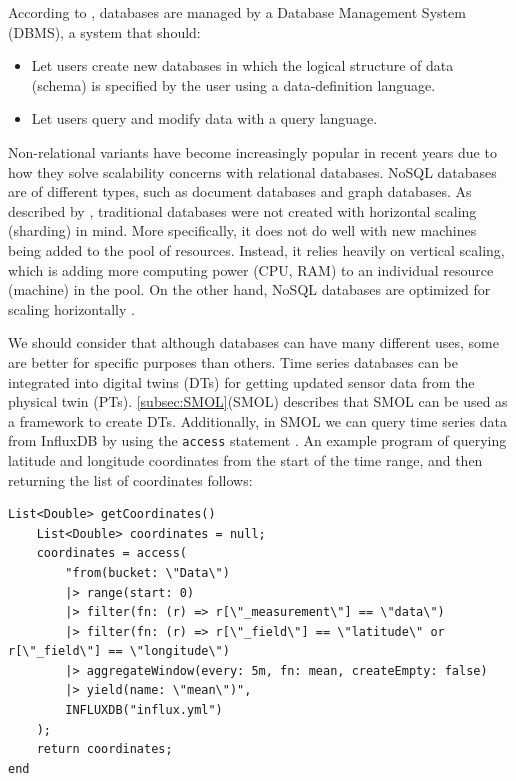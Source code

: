 \documentclass{article}
\begin{document}
According to \citeauthor{garcia-molina_database_2002}, databases are managed by a Database Management System (DBMS), a system that should:
\begin{itemize}
    \item Let users create new databases in which the logical structure of data (schema) is specified by the user using a data-definition language.
    \item Let users query and modify data with a query language.
\end{itemize}

Non-relational variants have become increasingly popular in recent years due to how they solve scalability concerns with relational databases. NoSQL databases are of different types, such as document databases and graph databases. As described by \citeauthor{mohamed_relational_2014}, traditional databases were not created with horizontal scaling (sharding) in mind. More specifically, it does not do well with new machines being added to the pool of resources. Instead, it relies heavily on vertical scaling, which is adding more computing power (CPU, RAM) to an individual resource (machine) in the pool. On the other hand, NoSQL databases are optimized for scaling horizontally \cite{mohamed_relational_2014, kim_geoycsb_2023}.

We should consider that although databases can have many different uses, some are better for specific purposes than others. Time series databases can be integrated into digital twins (DTs) for getting updated sensor data from the physical twin (PTs). \ref{subsec:SMOL}(SMOL) describes that SMOL can be used as a framework to create DTs. Additionally, in SMOL we can query time series data from InfluxDB by using the \verb|access| statement \cite{noauthor_time_nodate}. An example program of querying latitude and longitude coordinates from the start of the time range, and then returning the list of coordinates follows:

\begin{small}
    \begin{Verbatim}[frame=single,breaklines=true]
List<Double> getCoordinates()
    List<Double> coordinates = null;
    coordinates = access(
        "from(bucket: \"Data\")
        |> range(start: 0)
        |> filter(fn: (r) => r[\"_measurement\"] == \"data\")
        |> filter(fn: (r) => r[\"_field\"] == \"latitude\" or r[\"_field\"] == \"longitude\")
        |> aggregateWindow(every: 5m, fn: mean, createEmpty: false)
        |> yield(name: \"mean\")",
        INFLUXDB("influx.yml")
    );
    return coordinates;
end
    \end{Verbatim}
\end{small}
\end{document}

